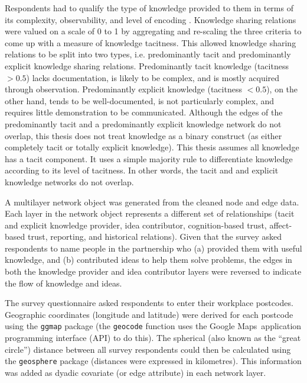 Respondents had to qualify the type of knowledge provided to them in terms of its complexity, observability, and level of encoding \citep{winter1987knowledge,zander1995knowledge,cavusgil2003tacit}. Knowledge sharing relations were valued on a scale of 0 to 1 by aggregating and re-scaling the three criteria to come up with a measure of knowledge tacitness. This allowed knowledge sharing relations to be split into two types, i.e. predominantly tacit and predominantly explicit knowledge sharing relations. Predominantly tacit knowledge (tacitness $> 0.5$) lacks documentation, is likely to be complex, and is mostly acquired through observation. Predominantly explicit knowledge (tacitness $< 0.5$), on the other hand, tends to be well-documented, is not particularly complex, and requires little demonstration to be communicated. Although the edges of the predominantly tacit and a predominantly explicit knowledge network do not overlap, this thesis does not treat knowledge as a binary construct (as either completely tacit or totally explicit knowledge). This thesis assumes all knowledge has a tacit component. It uses a simple majority rule to differentiate knowledge according to its level of tacitness. In other words, the tacit and and explicit knowledge networks do not overlap. \medskip

A multilayer network object was generated from the cleaned node and edge data. Each layer in the network object represents a different set of relationships (tacit and explicit knowledge provider, idea contributor, cognition-based trust, affect-based trust, reporting, and historical relations). Given that the survey asked respondents to name people in the partnership who (a) provided them with useful knowledge, and (b) contributed ideas to help them solve problems, the edges in both the knowledge provider and idea contributor layers were reversed to indicate the flow of knowledge and ideas. \medskip

The survey questionnaire asked respondents to enter their workplace postcodes. Geographic coordinates (longitude and latitude) were derived for each postcode using the \texttt{ggmap} package (the \texttt{geocode} function uses the Google Maps\texttrademark\ application programming interface (API) to do this). The spherical (also known as the \enquote{great circle}) distance between all survey respondents could then be calculated using the \texttt{geosphere} package (distances were expressed in kilometres). This information was added as dyadic covariate (or edge attribute) in each network layer. \medskip

